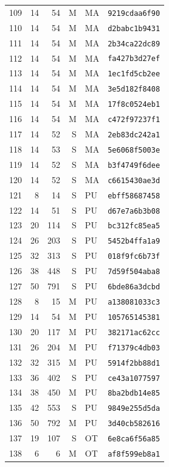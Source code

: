 \begin{longtable}{rrrrll}
109 & 14 & 54 & M & MA & \texttt{9219cdaa6f90} \\
110 & 14 & 54 & M & MA & \texttt{d2babc1b9431} \\
111 & 14 & 54 & M & MA & \texttt{2b34ca22dc89} \\
112 & 14 & 54 & M & MA & \texttt{fa427b3d27ef} \\
113 & 14 & 54 & M & MA & \texttt{1ec1fd5cb2ee} \\
114 & 14 & 54 & M & MA & \texttt{3e5d182f8408} \\
115 & 14 & 54 & M & MA & \texttt{17f8c0524eb1} \\
116 & 14 & 54 & M & MA & \texttt{c472f97237f1} \\
117 & 14 & 52 & S & MA & \texttt{2eb83dc242a1} \\
118 & 14 & 53 & S & MA & \texttt{5e6068f5003e} \\
119 & 14 & 52 & S & MA & \texttt{b3f4749f6dee} \\
120 & 14 & 52 & S & MA & \texttt{c6615430ae3d} \\
121 & 8 & 14 & S & PU & \texttt{ebff58687458} \\
122 & 14 & 51 & S & PU & \texttt{d67e7a6b3b08} \\
123 & 20 & 114 & S & PU & \texttt{bc312fc85ea5} \\
124 & 26 & 203 & S & PU & \texttt{5452b4ffa1a9} \\
125 & 32 & 313 & S & PU & \texttt{018f9fc6b73f} \\
126 & 38 & 448 & S & PU & \texttt{7d59f504aba8} \\
127 & 50 & 791 & S & PU & \texttt{6bde86a3dcbd} \\
128 & 8 & 15 & M & PU & \texttt{a138081033c3} \\
129 & 14 & 54 & M & PU & \texttt{105765145381} \\
130 & 20 & 117 & M & PU & \texttt{382171ac62cc} \\
131 & 26 & 204 & M & PU & \texttt{f71379c4db03} \\
132 & 32 & 315 & M & PU & \texttt{5914f2bb88d1} \\
133 & 36 & 402 & S & PU & \texttt{ce43a1077597} \\
134 & 38 & 450 & M & PU & \texttt{8ba2bdb14e85} \\
135 & 42 & 553 & S & PU & \texttt{9849e255d5da} \\
136 & 50 & 792 & M & PU & \texttt{3d40cb582616} \\
137 & 19 & 107 & S & OT & \texttt{6e8ca6f56a85} \\
138 & 6 & 6 & M & OT & \texttt{af8f599eb8a1} \\
\end{longtable}
\endgroup
